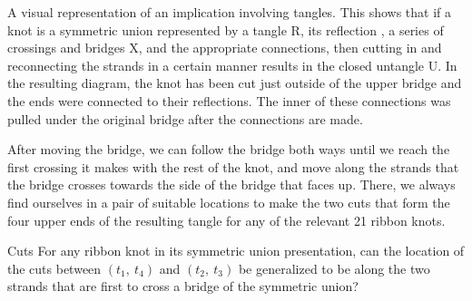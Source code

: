 \begin{paper}
{A visual representation of an implication involving tangles.
This shows that if a knot is a symmetric union represented by a tangle R, its
reflection \usebox{\knotR}, a series of crossings and bridges X, and the
appropriate connections, then cutting in and reconnecting the strands in a
certain manner results in the closed untangle U.
In the resulting diagram, the knot has been cut just outside of the upper bridge
and the ends were connected to their reflections.
The inner of these connections was pulled under the original bridge after the
connections are made.}

After moving the bridge, we can follow the bridge both ways until we reach the
first crossing it makes with the rest of the knot, and move along the strands
that the bridge crosses towards the side of the bridge that faces up.
There, we always find ourselves in a pair of suitable locations to make the two
cuts that form the four upper ends of the resulting tangle for any of the
relevant 21 ribbon knots.

\begin{paperqtn}{Cuts}
For any ribbon knot in its symmetric union presentation, can the location of the
cuts between $(t_1,~t_4)$ and $(t_2,~t_3)$ be generalized to be along the
two strands that are first to cross a bridge of the symmetric union?
\end{paperqtn}


\end{paper}
